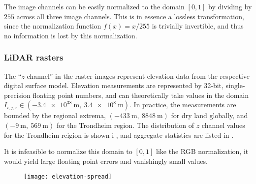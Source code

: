 The image channels can be easily normalized to the domain $[0, 1]$ by dividing by $255$ across all three image channels.
This is in essence a lossless transformation, since the normalization function $f(x) = x/255$ is trivially invertible, and thus no information is lost by this normalization.

\newpage
\subsubsection*{LiDAR rasters}

The \enquote{$z$ channel} in the raster images represent elevation data from the respective digital surface model.
Elevation measurements are represented by 32-bit, single-precision floating point numbers, and can theoretically take values in the domain $I_{i,j,z} \in (\SI{-3.4e38}{\meter},~\SI{3.4e8}{\meter})$.
In practice, the measurements are bounded by the regional extrema, $(\SI{-433}{\meter},~\SI{8848}{\meter})$ for dry land globally, and $(\SI{-9}{\meter},~\SI{569}{\meter})$ for the Trondheim region.
The distribution of $z$ channel values for the Trondheim reigion is shown i , and aggregate statistics are listed in .

\begin{figure}[htb]
  \begin{floatrow}
  \end{floatrow}
\end{figure}

It is infeasible to normalize this domain to $[0, 1]$ like the RGB normalization, it would yield large floating point errors and vanishingly small values.

\begin{figure}[htb]
  \centering
  \texttt{[image: elevation-spread]}
\end{figure}
